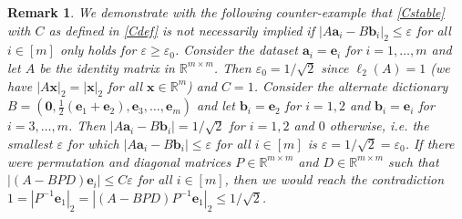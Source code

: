 \documentclass[journal, onecolumn]{IEEEtran}
\newtheorem{remark}{Remark}
\begin{document}
\begin{remark}
We demonstrate with the following counter-example that \eqref{Cstable} with $C$ as defined in \eqref{Cdef} is not necessarily implied if $|A\mathbf{a}_i - B\mathbf{b}_i|_2 \leq \varepsilon$ for all $i \in [m]$ only holds for $\varepsilon \geq \varepsilon_0$. Consider the dataset $\mathbf{a}_i = \mathbf{e}_i$ for $i = 1, \ldots, m$ and let $A$ be the identity matrix in $\mathbb{R}^{m \times m}$. Then $\varepsilon_0 = 1/\sqrt{2}$ since $\ell_2(A) = 1$ (we have $|A\mathbf{x}|_2 = |\mathbf{x}|_2$ for all $\mathbf{x} \in \mathbb{R}^m$) and $C = 1$. Consider the alternate dictionary $B = \left(\mathbf{0}, \frac{1}{2}(\mathbf{e}_1 + \mathbf{e}_2), \mathbf{e}_3, \ldots, \mathbf{e}_{m} \right)$ and let $\mathbf{b}_i = \mathbf{e}_2$ for $i = 1, 2$ and $\mathbf{b}_i = \mathbf{e}_i$ for $i = 3, \ldots, m$. Then $|A\mathbf{a}_i - B\mathbf{b}_i| = 1/\sqrt{2}$ for $i = 1, 2$ and $0$ otherwise, i.e. the smallest $\varepsilon$ for which $|A\mathbf{a}_i - B\mathbf{b}_i| \leq \varepsilon$ for all $i \in [m]$ is $\varepsilon = 1/\sqrt{2} = \varepsilon_0$. If there were permutation and diagonal matrices $P \in \mathbb{R}^{m \times m}$ and $D \in \mathbb{R}^{m \times m}$ such that $|(A-BPD)\mathbf{e}_i| \leq C\varepsilon$ for all $i \in [m]$, then we would reach the contradiction $1 = |P^{-1}\mathbf{e}_1|_2 = |(A-BPD)P^{-1}\mathbf{e}_1|_2 \leq 1/\sqrt{2}$.
\end{remark}
\end{document}
